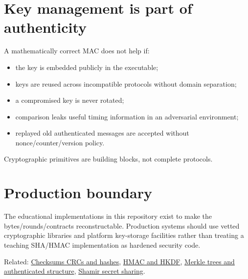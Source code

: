 \section{Key management is part of authenticity}\label{appendix-cbe594d1ab0a-key-management-is-part-of-authenticity}

A mathematically correct MAC does not help if:

\begin{itemize}
\tightlist
\item
  the key is embedded publicly in the executable;
\item
  keys are reused across incompatible protocols without domain separation;
\item
  a compromised key is never rotated;
\item
  comparison leaks useful timing information in an adversarial environment;
\item
  replayed old authenticated messages are accepted without nonce/counter/version policy.
\end{itemize}

Cryptographic primitives are building blocks, not complete protocols.

\section{Production boundary}\label{appendix-cbe594d1ab0a-production-boundary}

The educational implementations in this repository exist to make the bytes/rounds/contracts reconstructable. Production systems should use vetted cryptographic libraries and platform key-storage facilities rather than treating a teaching SHA/HMAC implementation as hardened security code.

Related: \hyperref[appendix-ed338677de0a]{Checksums CRCs and hashes}, \hyperref[appendix-50af792c9da7]{HMAC and HKDF}, \hyperref[appendix-098192f8d46d]{Merkle trees and authenticated structure}, \hyperref[appendix-5888fd6102dc]{Shamir secret sharing}.

